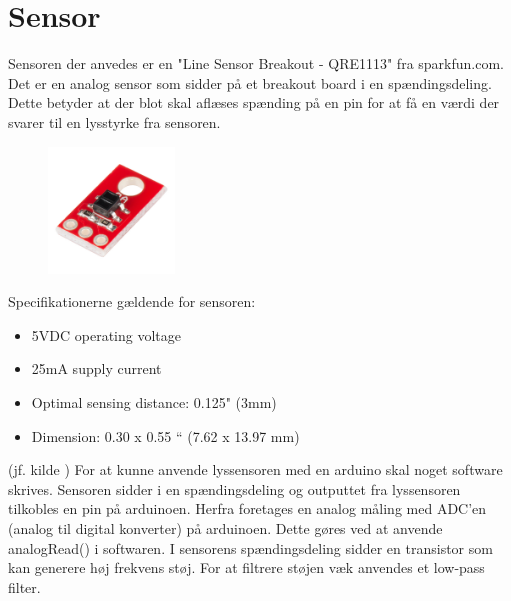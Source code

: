 \section{Sensor}
Sensoren der anvedes er en "Line Sensor Breakout - QRE1113" fra sparkfun.com\cite{sparkfun_link}. Det er en analog sensor som sidder på et breakout board i en spændingsdeling. Dette betyder at der blot skal aflæses spænding på en pin for at få en værdi der svarer til en lysstyrke fra sensoren.

\begin{figure}[h!]
  \centering
  \includegraphics[width=0.3\textwidth]{figures/lyssensor.png}
\end{figure}

Specifikationerne gældende for sensoren: 
\begin{itemize}  
\item 5VDC operating voltage 
\item 25mA supply current
\item Optimal sensing distance: 0.125" (3mm) 
\item Dimension: 0.30 x 0.55 “ (7.62 x 13.97 mm)
\end{itemize}

(jf. kilde \cite{sparkfun_link_sensor})
\newline
For at kunne anvende lyssensoren med en arduino skal noget software skrives. Sensoren sidder i en spændingsdeling og outputtet fra lyssensoren tilkobles en pin på arduinoen.
Herfra foretages en analog måling med ADC'en (analog til digital konverter) på arduinoen. Dette gøres ved at anvende analogRead() i softwaren.
\newline
I sensorens spændingsdeling sidder en transistor som kan generere høj frekvens støj. For at filtrere støjen væk anvendes et low-pass filter.
\newline
